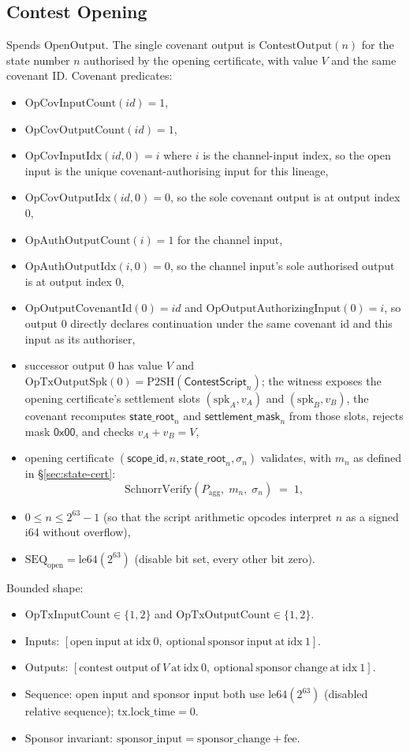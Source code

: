 \documentclass[10pt,a4paper]{article}
\begin{document}
\subsection{Contest Opening}
Spends $\mathrm{OpenOutput}$. The single covenant output is $\mathrm{ContestOutput}(n)$ for the state number $n$ authorised by the opening certificate, with value $V$ and the same covenant ID. Covenant predicates:
\begin{itemize}
  \item $\mathrm{OpCovInputCount}(id) = 1$,
  \item $\mathrm{OpCovOutputCount}(id) = 1$,
  \item $\mathrm{OpCovInputIdx}(id, 0) = i$ where $i$ is the channel-input index, so the open input is the unique covenant-authorising input for this lineage,
  \item $\mathrm{OpCovOutputIdx}(id, 0) = 0$, so the sole covenant output is at output index 0,
  \item $\mathrm{OpAuthOutputCount}(i) = 1$ for the channel input,
  \item $\mathrm{OpAuthOutputIdx}(i, 0) = 0$, so the channel input's sole authorised output is at output index 0,
  \item $\mathrm{OpOutputCovenantId}(0)=id$ and $\mathrm{OpOutputAuthorizingInput}(0)=i$, so output 0 directly declares continuation under the same covenant id and this input as its authoriser,
  \item successor output 0 has value $V$ and $\mathrm{OpTxOutputSpk}(0)=\mathrm{P2SH}(\mathsf{ContestScript}_n)$; the witness exposes the opening certificate's settlement slots $(\mathrm{spk}_A, v_A)$ and $(\mathrm{spk}_B, v_B)$, the covenant recomputes $\mathsf{state\_root}_n$ and $\mathsf{settlement\_mask}_n$ from those slots, rejects mask $\mathsf{0x00}$, and checks $v_A + v_B = V$,
  \item opening certificate $(\mathsf{scope\_id}, n, \mathsf{state\_root}_n, \sigma_n)$ validates, with $m_n$ as defined in \S\ref{sec:state-cert}:
  \[
    \mathrm{SchnorrVerify}(P_{\mathrm{agg}},\; m_n,\; \sigma_n) \;=\; 1,
  \]
  \item $0 \le n \le 2^{63}-1$ (so that the script arithmetic opcodes interpret $n$ as a signed i64 without overflow),
  \item $\mathrm{SEQ}_{\mathrm{open}} = \mathrm{le64}(2^{63})$ (disable bit set, every other bit zero).
\end{itemize}
Bounded shape:
\begin{itemize}
  \item $\mathrm{OpTxInputCount}\in\{1,2\}$ and $\mathrm{OpTxOutputCount}\in\{1,2\}$.
  \item Inputs: $[\mathrm{open\ input\ at\ idx\ }0,\ \mathrm{optional\ sponsor\ input\ at\ idx\ }1]$.
  \item Outputs: $[\mathrm{contest\ output\ of\ }V \mathrm{\ at\ idx\ }0,\ \mathrm{optional\ sponsor\ change\ at\ idx\ }1]$.
  \item Sequence: open input and sponsor input both use $\mathrm{le64}(2^{63})$ (disabled relative sequence); $\mathrm{tx.lock\_time} = 0$.
  \item Sponsor invariant: $\mathrm{sponsor\_input} = \mathrm{sponsor\_change} + \mathrm{fee}$.
\end{itemize}
\end{document}
